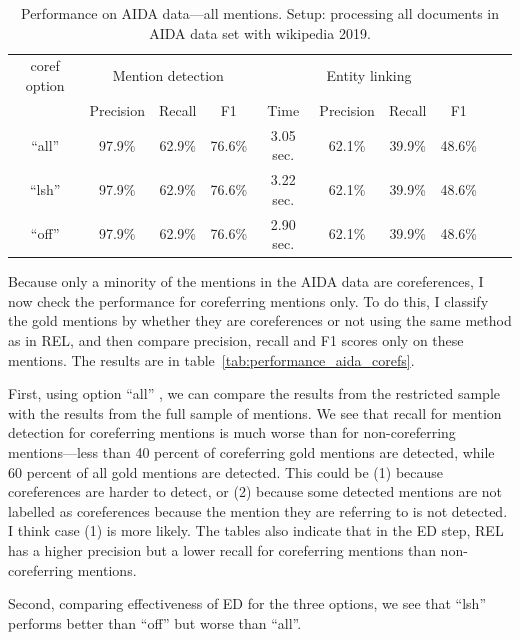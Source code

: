 \documentclass[a4paper,11pt]{article}
\numberwithin{equation}{section} %
\begin{document}
\begin{table}
 \begin{tabular}{c c c c c c c c c c}
\hline
 coref option & \multicolumn{3}{c}{Mention detection} & \multicolumn{4}{c}{Entity linking}  \\
        & Precision & Recall & F1 & Time & Precision & Recall & F1 \\
 \hline 
 ``all'' & 97.9\% & 62.9\% & 76.6\% & 3.05 sec. & 62.1\% & 39.9\% & 48.6\% \\  
 ``lsh'' & 97.9\% & 62.9\% & 76.6\% & 3.22 sec. & 62.1\% & 39.9\% & 48.6\% \\
 ``off'' & 97.9\% & 62.9\% & 76.6\% & 2.90 sec.  & 62.1\% & 39.9\% & 48.6\% \\ 
\hline 
\end{tabular}
\caption{Performance on AIDA data---all mentions. Setup: processing all documents in AIDA data set with wikipedia 2019.}
\label{tab:performance_aida_full}
\end{table}


Because only a minority of the mentions in the AIDA data are coreferences, I now check the performance for coreferring mentions only. To do this, I classify the gold mentions by whether they are coreferences or not using the same method as in REL, and then compare precision, recall and F1 scores only on these mentions. The results are in table~\ref{tab:performance_aida_corefs}. 

First, using option ``all'' , we can compare the results from the restricted sample with the results from the full sample of mentions. We see that recall for mention detection for coreferring mentions is much worse than for non-coreferring mentions---less than 40 percent of coreferring gold mentions are detected, while 60 percent of all gold mentions are detected. 
This could be (1) because coreferences are harder to detect, or (2) because some detected mentions are not labelled as coreferences because the mention they are referring to is not detected. I think case (1) is more likely.
The tables also indicate that in the ED step, REL has a higher precision but a lower recall for coreferring mentions than non-coreferring mentions. 

Second, comparing effectiveness of ED for the three options, we see that ``lsh'' performs better than ``off'' but worse than ``all''. 
\end{document}
